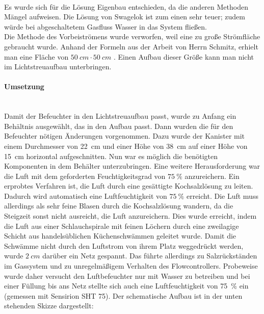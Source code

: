 \hfill \\

Es wurde sich für die Lösung Eigenbau entschieden, da die anderen Methoden Mängel aufweisen. Die Lösung von Swagelok ist zum einen sehr teuer; zudem würde bei abgeschaltetem Gasfluss Wasser in das System fließen. \\
Die Methode des Vorbeiströmens wurde verworfen, weil eine zu große Strömfläche gebraucht wurde. Anhand der Formeln aus der Arbeit von Herrn Schmitz, erhielt man eine Fläche von $\SI{50}{cm} \cdot \SI{50}{cm}$ \cite{Fallturmexperiment}. Einen Aufbau dieser Größe kann man nicht im Lichtstreuaufbau unterbringen.

\paragraph{Umsetzung}

\hfill \\

Damit der Befeuchter in den Lichtstreuaufbau passt, wurde zu Anfang ein Behältnis ausgewählt, das in den Aufbau passt. Dann wurden die für den Befeuchter nötigen Änderungen vorgenommen. Dazu wurde der Kanister mit einem Durchmesser von \SI{22}{cm} und einer Höhe von \SI{38}{cm} auf einer Höhe von \SI{15}{cm} horizontal aufgeschnitten. Nun war es möglich die benötigten Komponenten in dem Behälter unterzubringen.
Eine weitere Herausforderung war die Luft mit dem geforderten Feuchtigkeitsgrad von $\SI{75}{\%}$ anzureichern. Ein erprobtes Verfahren ist, die Luft durch eine gesättigte Kochsalzlösung zu leiten. Dadurch wird automatisch eine Luftfeuchtigkeit von $\SI{75}{\%}$ erreicht. Die Luft muss allerdings als sehr feine Blasen durch die Kochsalzlösung wandern, da die Steigzeit sonst nicht ausreicht, die Luft anzureichern. 
Dies wurde erreicht, indem die Luft aus einer Schlauchspirale mit feinen Löchern durch eine zweilagige Schicht aus handelsüblichen Küchenschwämmen geleitet wurde.
Damit die Schwämme nicht durch den Luftstrom von ihrem Platz weggedrückt werden, wurde $\SI{2}{cm}$ darüber ein Netz gespannt. Das führte allerdings zu Salzrückständen im Gassystem und zu unregelmäßigem Verhalten des Flowcontrollers. Probeweise wurde daher versucht den Luftbefeuchter nur mit Wasser zu betreiben und bei einer Füllung bis ans Netz stellte sich auch eine Luftfeuchtigkeit von \SI{75}{\%} ein (gemessen mit Sensirion SHT 75). Der schematische Aufbau ist in der unten stehenden Skizze dargestellt: \\

